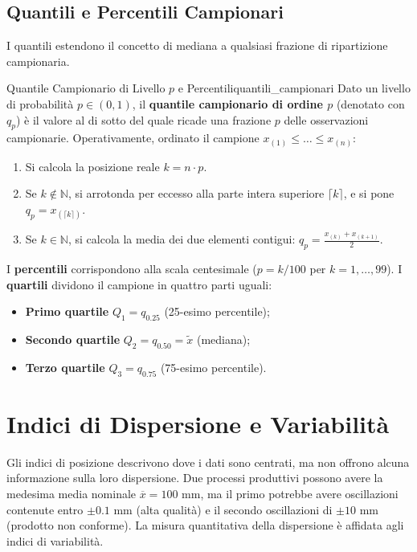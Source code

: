 \subsection{Quantili e Percentili Campionari}

I quantili estendono il concetto di mediana a qualsiasi frazione di ripartizione campionaria.

\begin{definizione}{Quantile Campionario di Livello $p$ e Percentili}{quantili_campionari}
Dato un livello di probabilità $p \in (0, 1)$, il \textbf{quantile campionario di ordine $p$} (denotato con $q_p$) è il valore al di sotto del quale ricade una frazione $p$ delle osservazioni campionarie.
Operativamente, ordinato il campione $x_{(1)} \le \dots \le x_{(n)}$:
\begin{enumerate}
    \item Si calcola la posizione reale $k = n \cdot p$.
    \item Se $k \notin \mathbb{N}$, si arrotonda per eccesso alla parte intera superiore $\lceil k \rceil$, e si pone $q_p = x_{(\lceil k \rceil)}$.
    \item Se $k \in \mathbb{N}$, si calcola la media dei due elementi contigui: $q_p = \frac{x_{(k)} + x_{(k+1)}}{2}$.
\end{enumerate}
I \textbf{percentili} corrispondono alla scala centesimale ($p = k/100$ per $k=1,\dots,99$). I \textbf{quartili} dividono il campione in quattro parti uguali:
\begin{itemize}
    \item \textbf{Primo quartile} $Q_1 = q_{0.25}$ (25-esimo percentile);
    \item \textbf{Secondo quartile} $Q_2 = q_{0.50} = \widetilde{x}$ (mediana);
    \item \textbf{Terzo quartile} $Q_3 = q_{0.75}$ (75-esimo percentile).
\end{itemize}
\end{definizione}

\section{Indici di Dispersione e Variabilità}
\label{sec:indici_variabilita}

Gli indici di posizione descrivono dove i dati sono centrati, ma non offrono alcuna informazione sulla loro dispersione. Due processi produttivi possono avere la medesima media nominale $\overline{x} = 100\text{ mm}$, ma il primo potrebbe avere oscillazioni contenute entro $\pm 0.1\text{ mm}$ (alta qualità) e il secondo oscillazioni di $\pm 10\text{ mm}$ (prodotto non conforme). La misura quantitativa della dispersione è affidata agli indici di variabilità.

